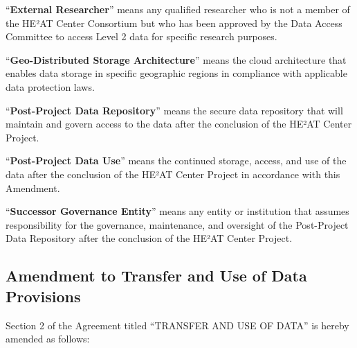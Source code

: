 \documentclass[12pt,letterpaper]{article}
\begin{document}
``\textbf{External Researcher}'' means any qualified researcher who is not a member of the HE²AT Center Consortium but who has been approved by the Data Access Committee to access Level 2 data for specific research purposes.

``\textbf{Geo-Distributed Storage Architecture}'' means the cloud architecture that enables data storage in specific geographic regions in compliance with applicable data protection laws.

``\textbf{Post-Project Data Repository}'' means the secure data repository that will maintain and govern access to the data after the conclusion of the HE²AT Center Project.

``\textbf{Post-Project Data Use}'' means the continued storage, access, and use of the data after the conclusion of the HE²AT Center Project in accordance with this Amendment.

``\textbf{Successor Governance Entity}'' means any entity or institution that assumes responsibility for the governance, maintenance, and oversight of the Post-Project Data Repository after the conclusion of the HE²AT Center Project.

\subsection{Amendment to Transfer and Use of Data Provisions}

Section 2 of the Agreement titled ``TRANSFER AND USE OF DATA'' is hereby amended as follows:
\end{document}
